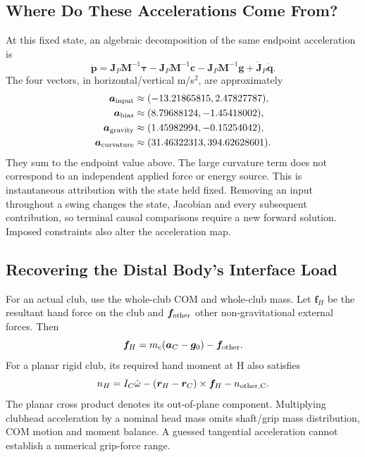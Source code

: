 \subsection*{Where Do These Accelerations Come From?}

At this fixed state, an algebraic decomposition of the same endpoint acceleration is
\[
\ddot{\bm p}=\bm J_P\bm M^{-1}\bm\tau
-\bm J_P\bm M^{-1}\bm c
-\bm J_P\bm M^{-1}\bm g
+\dot{\bm J}_P\dot{\bm q}.
\]
The four vectors, in horizontal/vertical m/s\(^2\), are approximately
\[
\begin{aligned}
\bm a_{\rm input}&\approx(-13.21865815,2.47827787),\\
\bm a_{\rm bias}&\approx(8.79688124,-1.45418002),\\
\bm a_{\rm gravity}&\approx(1.45982994,-0.15254042),\\
\bm a_{\rm curvature}&\approx(31.46322313,394.62628601).
\end{aligned}
\]
They sum to the endpoint value above. The large curvature term does not correspond to an independent applied force or energy source. This is instantaneous attribution with the state held fixed. Removing an input throughout a swing changes the state, Jacobian and every subsequent contribution, so terminal causal comparisons require a new forward solution. Imposed constraints also alter the acceleration map.

\subsection*{Recovering the Distal Body's Interface Load}

For an actual club, use the whole-club COM and whole-club mass. Let \(\bm f_H\) be the resultant hand force on the club and \(\bm f_{\rm other}\) other non-gravitational external forces. Then
\begin{equation}
\bm f_H=m_c(\bm a_C-\bm g_0)-\bm f_{\rm other}.
\label{eq:ch04_grip_centripetal}
\end{equation}
For a planar rigid club, its required hand moment at H also satisfies
\begin{equation}
n_H=I_C\dot\omega-(\bm r_H-\bm r_C)\times\bm f_H-n_{\rm other,C}.
\label{eq:ch04_grip_tangential}
\end{equation}
The planar cross product denotes its out-of-plane component. Multiplying clubhead acceleration by a nominal head mass omits shaft/grip mass distribution, COM motion and moment balance. A guessed tangential acceleration cannot establish a numerical grip-force range.

